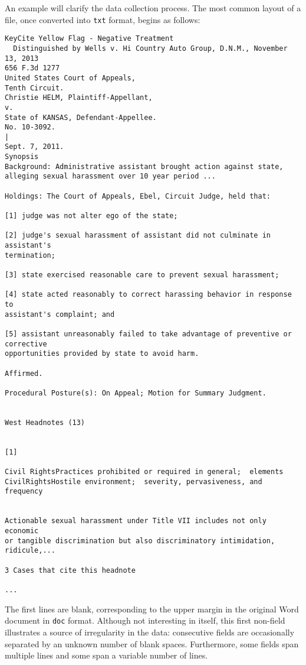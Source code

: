 \documentclass[11pt]{paper}
\begin{document}
An example will clarify the data collection process. 
The most common layout of a file, once converted into \texttt{txt} format, 
begins as follows:

\begin{verbatim}
KeyCite Yellow Flag - Negative Treatment
  Distinguished by Wells v. Hi Country Auto Group, D.N.M., November 13, 2013
656 F.3d 1277
United States Court of Appeals,
Tenth Circuit.
Christie HELM, Plaintiff-Appellant,
v.
State of KANSAS, Defendant-Appellee.
No. 10-3092.
|
Sept. 7, 2011.
Synopsis
Background: Administrative assistant brought action against state, 
alleging sexual harassment over 10 year period ...

Holdings: The Court of Appeals, Ebel, Circuit Judge, held that:
 
[1] judge was not alter ego of the state;

[2] judge's sexual harassment of assistant did not culminate in assistant's 
termination;
 
[3] state exercised reasonable care to prevent sexual harassment;
 
[4] state acted reasonably to correct harassing behavior in response to 
assistant's complaint; and
 
[5] assistant unreasonably failed to take advantage of preventive or corrective 
opportunities provided by state to avoid harm.
 
Affirmed.
 
Procedural Posture(s): On Appeal; Motion for Summary Judgment.


West Headnotes (13)


[1]

Civil RightsPractices prohibited or required in general;  elements
CivilRightsHostile environment;  severity, pervasiveness, and frequency


Actionable sexual harassment under Title VII includes not only economic 
or tangible discrimination but also discriminatory intimidation, ridicule,...

3 Cases that cite this headnote

...

\end{verbatim}

The first lines are blank, corresponding to the upper margin in the original 
Word document in \texttt{doc} format.  
Although not interesting in itself, this first non-field illustrates a source 
of irregularity in the data: consecutive fields are occasionally separated 
by an unknown number of blank spaces. 
Furthermore, some fields span multiple lines and some span a variable number 
of lines. 
\end{document}
